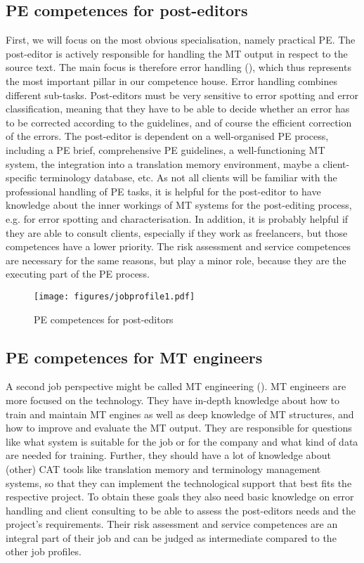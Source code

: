 \subsection{PE competences for post-editors}\label{sec:9:2:1}

First, we will focus on the most obvious specialisation, namely practical PE. The post-editor is actively responsible for handling the MT output in respect to the source text. The main focus is therefore error handling (), which thus represents the most important pillar in our competence house. Error handling combines different sub-tasks. Post-editors must be very sensitive to error spotting and error classification, meaning that they have to be able to decide whether an error has to be corrected according to the guidelines, and of course the efficient correction of the errors. The post-editor is dependent on a well-organised PE process, including a PE brief, comprehensive PE guidelines, a well-functioning MT system, the integration into a translation memory environment, maybe a client-specific terminology database, etc. As not all clients will be familiar with the professional handling of PE tasks, it is helpful for the post-editor to have knowledge about the inner workings of MT systems for the post-editing process, e.g. for error spotting and  characterisation. In addition, it is probably helpful if they are able to consult clients, especially if they work as freelancers, but those competences have a lower priority. The risk assessment and service competences are necessary for the same reasons, but play a minor role, because they are the executing part of the PE process.

\begin{figure} 
\texttt{[image: figures/jobprofile1.pdf]}
\caption{PE competences for post-editors}
\label{fig:key:9:2:1}
\end{figure}


\subsection{PE competences for MT engineers}\label{sec:9:2:2}

A second job perspective might be called MT engineering (). MT engineers are more focused on the technology. They have in-depth knowledge about how to train and maintain MT engines as well as deep knowledge of MT structures, and how to improve and evaluate the MT output. They are responsible for questions like what system is suitable for the job or for the company and what kind of data are needed for training. Further, they should have a lot of knowledge about (other) CAT tools like translation memory and terminology management systems, so that they can implement the technological support that best fits the respective project. To obtain these goals they also need basic knowledge on error handling and client consulting to be able to assess the post-editors needs and the project's requirements. Their risk assessment and service competences are an integral part of their job and can be judged as intermediate compared to the other job profiles.

